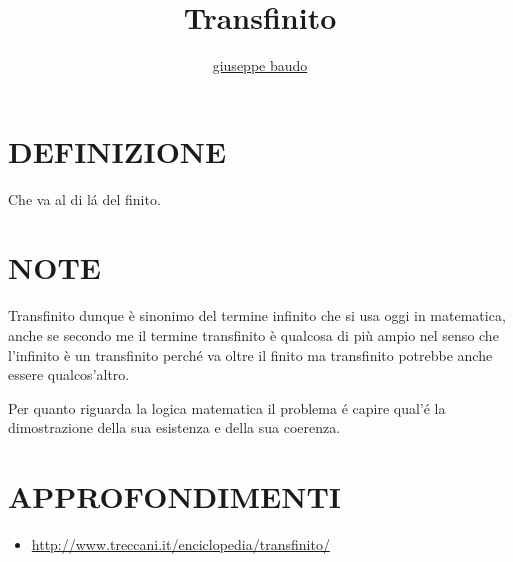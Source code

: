 \documentclass[a4paper,10pt]{article}
\title{Transfinito}
\author{\href{http://www.baudo.hol.es}{giuseppe baudo}}
\begin{document}
\maketitle

\section{DEFINIZIONE}
Che va al di l\'{a} del finito.

\section{NOTE}
Transfinito dunque è sinonimo del termine infinito che si usa oggi in matematica, anche se secondo me il termine transfinito è qualcosa di più ampio
nel senso che l'infinito è un transfinito perch\'{e} va oltre il finito ma transfinito potrebbe anche essere qualcos'altro.

Per quanto riguarda la logica matematica il problema \'{e} capire qual'\'{e} la dimostrazione della sua esistenza e della sua coerenza.

\section{APPROFONDIMENTI}
\begin{itemize}
 \item \url{http://www.treccani.it/enciclopedia/transfinito/}
\end{itemize}
\end{document}
